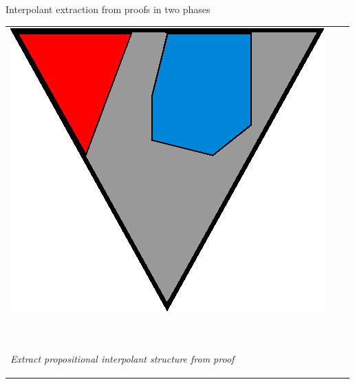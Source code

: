 \documentclass[final,hyperref={pdfpagelabels=true}]{beamer}
\begin{document}
\begin{frame}
\begin{columns}[t]
\begin{column}{\mycolwidth}
\begin{block}{Interpolant extraction from proofs in two phases \cite{Huang95}}
\begin{tabular}{p{}ll}
					\multicolumn{1}{m{\fakemulticolwidth}}{
						\includegraphics[width=\proofwidth]{figures/two_phase_draft_proof}
					}
					&
						\vspace*{0.5em}
					\\

					\multicolumn{2}{l}{
						\proofindent{\stagearrow} ~\parbox[c]{12em}{\emph{ Extract propositional interpolant structure from proof}}
						\vspace*{0.5em}
				}
				 \\
			 


\end{tabular}
\end{block}
\end{column}
\end{columns}
\end{frame}
\end{document}
